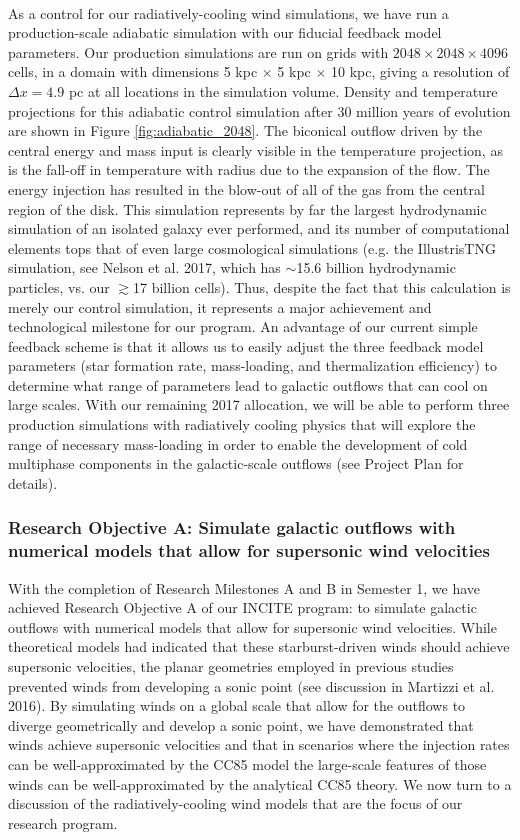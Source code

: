 \documentclass[11pt,letterpaper,english]{article}
\begin{document}
~\\
As a control for our radiatively-cooling wind simulations, we have run a production-scale adiabatic simulation with our fiducial feedback model parameters. Our production simulations are run on grids with $2048\times2048\times4096$ cells, in a domain with dimensions 5 kpc $\times$ 5 kpc $\times$ 10 kpc, giving a resolution of $\Delta x=4.9$ pc at all locations in the simulation volume. Density and temperature projections for this adiabatic control simulation after 30 million years of evolution are shown in Figure \ref{fig:adiabatic_2048}. The biconical outflow driven by the central energy and mass input is clearly visible in the temperature projection, as is the fall-off in temperature with radius due to the expansion of the flow. The energy injection has resulted in the blow-out of all of the gas from the central region of the disk. This simulation represents by far the largest hydrodynamic simulation of an isolated galaxy ever performed, and its number of computational elements tops that of even large cosmological simulations (e.g. the IllustrisTNG simulation, see Nelson et al. 2017, which has $\sim$15.6 billion hydrodynamic particles, vs. our $\gtrsim$17 billion cells). Thus, despite the fact that this calculation is merely our control simulation, it represents a major achievement and technological milestone for our program.
An advantage of our current simple feedback scheme is that it allows us to easily adjust the three feedback model parameters (star formation rate, mass-loading, and thermalization efficiency) to determine what range of parameters lead to galactic outflows that can cool on large scales. With our remaining 2017 allocation, we will be able to perform three production simulations with radiatively cooling physics that will explore the range of necessary mass-loading in order to enable the development of cold multiphase components in the
galactic-scale outflows (see Project Plan for details).

\subsubsection{Research Objective A: Simulate galactic outflows with numerical models that allow for supersonic wind velocities}

With the completion of Research Milestones A and B in Semester 1, we have achieved Research Objective A of our INCITE program: to simulate galactic outflows with numerical models that allow for supersonic wind velocities. While theoretical models had indicated that these starburst-driven winds should achieve supersonic velocities, the planar geometries employed in previous studies prevented winds from developing a sonic point (see discussion in Martizzi et al. 2016). By simulating winds on a global scale that allow
for the outflows to diverge geometrically and develop a sonic point, we have demonstrated that winds achieve supersonic velocities and that in scenarios where the injection rates can be well-approximated by the CC85 model the large-scale features of those winds can be well-approximated by the analytical CC85 theory. We now turn to a discussion of the radiatively-cooling wind models that are the focus of our research program.
\end{document}
